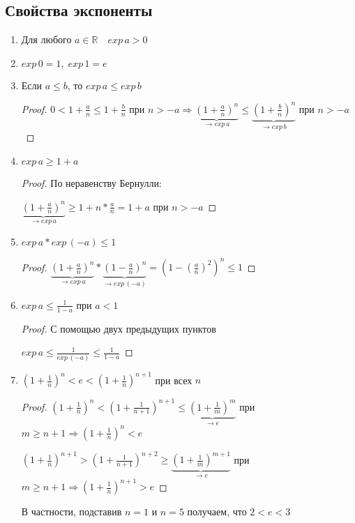\subsection{Свойства экспоненты}
    \begin{enumerate}
        \item Для любого $a \in \mathbb{R} \quad exp\,a > 0$
        \item $exp\,0 = 1,\; exp\,1 = e$
        \item Если $a \leqslant b$, то $exp\,a \leqslant exp\,b$
        \begin{proof}
            $0 < 1 + \frac{a}{n} \leqslant 1 + \frac{b}{n}$ при $n > -a \Rightarrow \underbrace{(1 + \frac{a}{n})^n}_{\to exp\,a} \leqslant \underbrace{(1 + \frac{b}{n})^n}_{\to exp\,b}$ при $n > -a$
        \end{proof}
        \item $exp\,a \geqslant 1 + a$
        \begin{proof}
            По неравенству Бернулли:
            
            $\underbrace{(1 + \frac{a}{n})^n}_{\to exp\,a} \geqslant 1 + n * \frac{a}{n} = 1 + a$ при $n > -a$
        \end{proof}
        \item $exp\,a * exp\,(-a) \leqslant 1$
        \begin{proof}
            $\underbrace{(1 + \frac{a}{n})^n}_{\to exp\,a} * \underbrace{(1 - \frac{a}{n})^n}_{\to exp\,(-a)} = (1 - (\frac{a}{n})^2)^n \leqslant 1$
        \end{proof}
        \item $exp\,a \leqslant \frac{1}{1 - a}$ при $a < 1$
        \begin{proof}
            С помощью двух предыдущих пунктов
            
            $exp\,a \leqslant\frac{1}{exp\,(-a)} \leqslant \frac{1}{1 - a}$
        \end{proof}
        \item $(1 + \frac{1}{n})^n < e < (1 + \frac{1}{n})^{n + 1}$ при всех $n$
        \begin{proof}
            $(1 + \frac{1}{n})^n < (1 + \frac{1}{n+1})^{n+1} \leqslant \underbrace{(1 + \frac{1}{m})^{m}}_{\to e}$ при $m
            \geqslant n + 1 \Rightarrow (1 + \frac{1}{n})^n < e$
            
            $(1 + \frac{1}{n})^{n + 1} > (1 + \frac{1}{n+1})^{n + 2} \geqslant \underbrace{(1 + \frac{1}{m})^{m + 1}}_{\to e}$ при $m \geqslant n + 1 \Rightarrow (1 + \frac{1}{n})^{n + 1} > e$
        \end{proof}
        В частности, подставив $n = 1$ и $n = 5$ получаем, что $2 < e < 3$
    \end{enumerate}